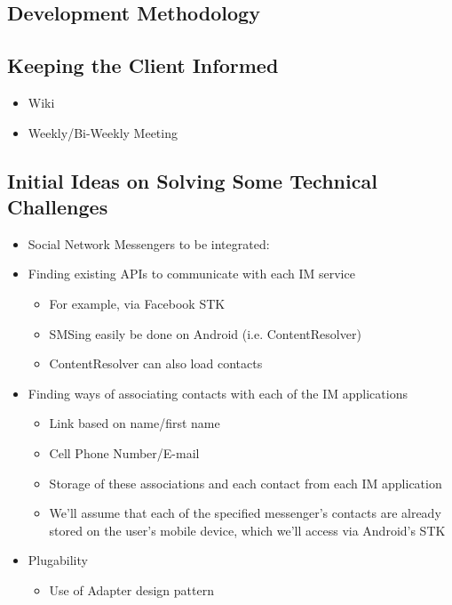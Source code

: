 

\subsection{Development Methodology}


\subsection{Keeping the Client Informed}
\begin{itemize}
    \item Wiki
    \item Weekly/Bi-Weekly Meeting
\end{itemize}
\subsection{Initial Ideas on Solving Some Technical Challenges}
\begin{itemize}
    \item Social Network Messengers to be integrated:
    \item Finding existing APIs to communicate with each IM service 
        \begin{itemize}
            \item For example, via Facebook STK
            \item SMSing easily be done on Android (i.e. ContentResolver)
            \item ContentResolver can also load contacts
        \end{itemize}
    \item Finding ways of associating contacts with each of the IM applications
        \begin{itemize}
            \item Link based on name/first name
            \item Cell Phone Number/E-mail
            \item Storage of these associations and each contact from each IM application
            \item We'll assume that each of the specified messenger's contacts are already stored on the user's mobile device, which we'll access via Android's STK
        \end{itemize}
    \item Plugability
        \begin{itemize}
            \item Use of Adapter design pattern
        \end{itemize}
\end{itemize}
